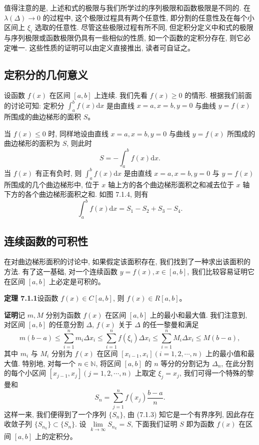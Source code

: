 \documentclass[UTF8,12pt,a4paper,fontset=fandol]{ctexart}
\begin{document}
值得注意的是, 上述和式的极限与我们所学过的序列极限和函数极限是不同的. 在 $\lambda(\Delta)\to0$ 的过程中, 这个极限过程具有两个任意性, 即分割的任意性及在每个小区间上 $\xi_i$ 选取的任意性. 尽管这些极限过程有所不同, 但定积分定义中和式的极限与序列极限或函数极限仍具有一些相似的性质, 如一个函数的定积分存在, 则它必定唯一. 这些性质的证明可以由定义直接推出, 读者可自证之。

\subsection{定积分的几何意义}

设函数 $f(x)$ 在区间 $[a,b]$ 上连续. 我们先看 $f(x)\geq0$ 的情形. 根据我们前面的讨论可知: 定积分 $\int_a^b f(x)\mathrm dx$ 是由直线 $x=a,x=b,y=0$ 与曲线 $y=f(x)$ 所围成的曲边梯形的面积 $S$。

当 $f(x)\leq0$ 时, 同样地设由直线 $x=a,x=b,y=0$ 与曲线 $y=f(x)$ 所围成的曲边梯形的面积为 $S$, 则此时
\[
  S=-\int_a^b f(x)\mathrm dx.
\]
当 $f(x)$ 有正有负时, 则 $\int_a^b f(x)\mathrm dx$ 是由直线 $x=a,x=b,y=0$ 与 $y=f(x)$ 所围成的几个曲边梯形中, 位于 $x$ 轴上方的各个曲边梯形面积之和减去位于 $x$ 轴下方的各个曲边梯形面积之和. 如图 7.1.4, 则有
\[
  \int_a^b f(x)\mathrm dx=S_1-S_2+S_3-S_4.
\]

\subsection{连续函数的可积性}

在对曲边梯形面积的讨论中, 如果假定该面积存在, 我们找到了一种求出该面积的方法. 有了这一基础, 对一个连续函数 $y=f(x),x\in[a,b]$, 我们比较容易证明它在区间 $[a,b]$ 上必定是可积的。

\noindent\textbf{定理 7.1.1}\quad 设函数 $f(x)\in C[a,b]$, 则 $f(x)\in R[a,b]$。

\noindent\textbf{证明}\quad 记 $m,M$ 分别为函数 $f(x)$ 在区间 $[a,b]$ 上的最小和最大值. 我们注意到, 对区间 $[a,b]$ 的任意分割 $\Delta$, $f(x)$ 关于 $\Delta$ 的任一黎曼和满足
\begin{equation}
  m(b-a)\leq \sum_{i=1}^n m_i\Delta x_i
  \leq \sum_{i=1}^n f(\xi_i)\Delta x_i
  \leq \sum_{i=1}^n M_i\Delta x_i
  \leq M(b-a),
  \tag{7.1.3}
\end{equation}
其中 $m_i$ 与 $M_i$ 分别为 $f(x)$ 在区间 $[x_{i-1},x_i](i=1,2,\cdots,n)$ 上的最小值和最大值. 特别地, 对每一个 $n\in\mathbb N$, 将区间 $[a,b]$ 的 $n$ 等分的分割记为 $\Delta_n$, 在此分割的每个小区间 $[x_{j-1},x_j](j=1,2,\cdots,n)$ 上取定 $\xi_j=x_j$, 我们可得一个特殊的黎曼和
\[
  S_n=\sum_{j=1}^n f(x_j)\frac{b-a}{n}.
\]
这样一来, 我们便得到了一个序列 $\{S_n\}$, 由 (7.1.3) 知它是一个有界序列, 因此存在收敛子列 $\{S_{n_k}\}\subset\{S_n\}$. 设 $\lim\limits_{k\to\infty}S_{n_k}=S$, 下面我们证明 $S$ 即为函数 $f(x)$ 在区间 $[a,b]$ 上的定积分。
\end{document}
